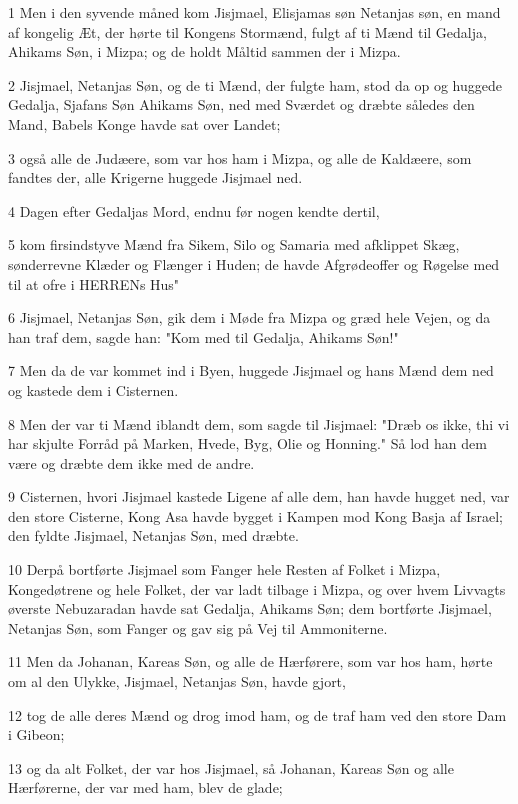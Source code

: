 \par 1 Men i den syvende måned kom Jisjmael, Elisjamas søn Netanjas søn, en mand af kongelig Æt, der hørte til Kongens Stormænd, fulgt af ti Mænd til Gedalja, Ahikams Søn, i Mizpa; og de holdt Måltid sammen der i Mizpa.
\par 2 Jisjmael, Netanjas Søn, og de ti Mænd, der fulgte ham, stod da op og huggede Gedalja, Sjafans Søn Ahikams Søn, ned med Sværdet og dræbte således den Mand, Babels Konge havde sat over Landet;
\par 3 også alle de Judæere, som var hos ham i Mizpa, og alle de Kaldæere, som fandtes der, alle Krigerne huggede Jisjmael ned.
\par 4 Dagen efter Gedaljas Mord, endnu før nogen kendte dertil,
\par 5 kom firsindstyve Mænd fra Sikem, Silo og Samaria med afklippet Skæg, sønderrevne Klæder og Flænger i Huden; de havde Afgrødeoffer og Røgelse med til at ofre i HERRENs Hus"
\par 6 Jisjmael, Netanjas Søn, gik dem i Møde fra Mizpa og græd hele Vejen, og da han traf dem, sagde han: "Kom med til Gedalja, Ahikams Søn!"
\par 7 Men da de var kommet ind i Byen, huggede Jisjmael og hans Mænd dem ned og kastede dem i Cisternen.
\par 8 Men der var ti Mænd iblandt dem, som sagde til Jisjmael: "Dræb os ikke, thi vi har skjulte Forråd på Marken, Hvede, Byg, Olie og Honning." Så lod han dem være og dræbte dem ikke med de andre.
\par 9 Cisternen, hvori Jisjmael kastede Ligene af alle dem, han havde hugget ned, var den store Cisterne, Kong Asa havde bygget i Kampen mod Kong Basja af Israel; den fyldte Jisjmael, Netanjas Søn, med dræbte.
\par 10 Derpå bortførte Jisjmael som Fanger hele Resten af Folket i Mizpa, Kongedøtrene og hele Folket, der var ladt tilbage i Mizpa, og over hvem Livvagts øverste Nebuzaradan havde sat Gedalja, Ahikams Søn; dem bortførte Jisjmael, Netanjas Søn, som Fanger og gav sig på Vej til Ammoniterne.
\par 11 Men da Johanan, Kareas Søn, og alle de Hærførere, som var hos ham, hørte om al den Ulykke, Jisjmael, Netanjas Søn, havde gjort,
\par 12 tog de alle deres Mænd og drog imod ham, og de traf ham ved den store Dam i Gibeon;
\par 13 og da alt Folket, der var hos Jisjmael, så Johanan, Kareas Søn og alle Hærførerne, der var med ham, blev de glade;
